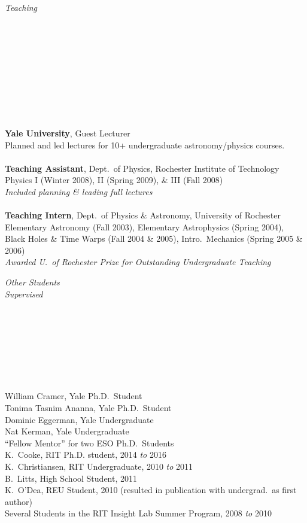 \documentclass[11pt]{article}
\begin{document}
\hspace{2.5mm} \parbox{1.5in}{\textit{Teaching \\\\\\\\\\\\\\\\\\\\}} \parbox{5.15in}{
\textbf{Yale University}, Guest Lecturer\\
Planned and led lectures for 10+ undergraduate astronomy/physics courses. \\
\\
\textbf{Teaching Assistant}, Dept.~of Physics, Rochester Institute of Technology \\
Physics I (Winter 2008), II (Spring 2009), \& III (Fall 2008) \\
\textit{Included planning \& leading full lectures}\\
\\
\textbf{Teaching Intern}, Dept.~of Physics \& Astronomy, University of Rochester \\
Elementary Astronomy (Fall 2003), Elementary Astrophysics (Spring 2004),
Black Holes \& Time Warps (Fall 2004 \& 2005), Intro.~Mechanics (Spring 2005 \& 2006) \\ \textit{Awarded U.~of Rochester Prize for Outstanding Undergraduate Teaching}}




\vspace{4mm}


\hspace{2.5mm} \parbox{1.5in}{\textit{Other Students \\ Supervised \\\\\\\\\\\\\\\\}} \parbox{5.15in}{
William Cramer, Yale Ph.D.~Student\\
Tonima Tasnim Ananna, Yale Ph.D.~Student\\
Dominic Eggerman, Yale Undergraduate \\
Nat Kerman, Yale Undergraduate\\
``Fellow Mentor'' for two ESO Ph.D.~Students \\
K.~Cooke, RIT Ph.D. student, 2014 \textit{to} 2016 \\
K.~Christiansen, RIT Undergraduate, 2010 \textit{to} 2011 \\ B.~Litts, High School Student, 2011 \\ K.~O'Dea, REU Student, 2010 (resulted in publication with undergrad.~as first author)  \\  Several Students in the RIT Insight Lab Summer Program, 2008 \textit{to} 2010}\\
\end{document}
